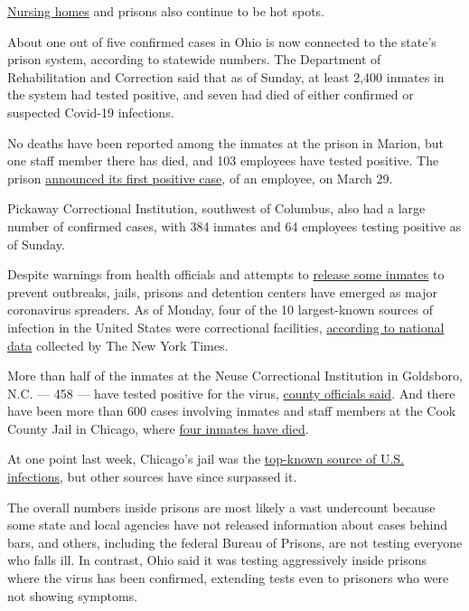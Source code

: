 \href{https://www.nytimes3xbfgragh.onion/2020/04/19/nyregion/coronavirus-nj-andover-nursing-home-deaths.html}{Nursing
homes} and prisons also continue to be hot spots.

About one out of five confirmed cases in Ohio is now connected to the
state's prison system, according to statewide numbers. The Department of
Rehabilitation and Correction said that as of Sunday, at least 2,400
inmates in the system had tested positive, and seven had died of either
confirmed or suspected Covid-19 infections.

No deaths have been reported among the inmates at the prison in Marion,
but one staff member there has died, and 103 employees have tested
positive. The prison
\href{https://www.drc.ohio.gov/Family/COVID-19-UPDATES}{announced its
first positive case}, of an employee, on March 29.

Pickaway Correctional Institution, southwest of Columbus, also had a
large number of confirmed cases, with 384 inmates and 64 employees
testing positive as of Sunday.

Despite warnings from health officials and attempts to
\href{https://www.nytimes3xbfgragh.onion/2020/03/30/us/coronavirus-prisons-jails.html}{release
some inmates} to prevent outbreaks, jails, prisons and detention centers
have emerged as major coronavirus spreaders. As of Monday, four of the
10 largest-known sources of infection in the United States were
correctional facilities,
\href{https://www.nytimes3xbfgragh.onion/interactive/2020/us/coronavirus-us-cases.html}{according
to national data} collected by The New York Times.

More than half of the inmates at the Neuse Correctional Institution in
Goldsboro, N.C. --- 458 --- have tested positive for the virus,
\href{https://www.waynegov.com/946/Coronavirus-COVID-19}{county
officials said}. And there have been more than 600 cases involving
inmates and staff members at the Cook County Jail in Chicago, where
\href{https://www.chicagotribune.com/news/breaking/ct-4th-ccj-covid19-death-20200420-fwwoavnzrzfznnymlebyq2umwi-story.html}{four
inmates have died}.

At one point last week, Chicago's jail was the
\href{https://www.nytimes3xbfgragh.onion/2020/04/08/us/coronavirus-cook-county-jail-chicago.html}{top-known
source of U.S. infections}, but other sources have since surpassed it.

The overall numbers inside prisons are most likely a vast undercount
because some state and local agencies have not released information
about cases behind bars, and others, including the federal Bureau of
Prisons, are not testing everyone who falls ill. In contrast, Ohio said
it was testing aggressively inside prisons where the virus has been
confirmed, extending tests even to prisoners who were not showing
symptoms.

